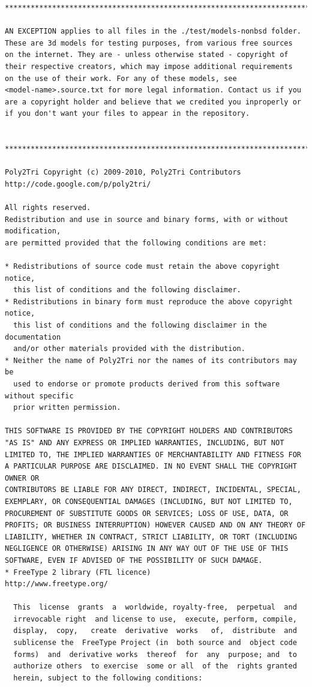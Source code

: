 \documentclass{article}
\begin{document}
\begin{lstlisting}
******************************************************************************

AN EXCEPTION applies to all files in the ./test/models-nonbsd folder.
These are 3d models for testing purposes, from various free sources
on the internet. They are - unless otherwise stated - copyright of
their respective creators, which may impose additional requirements
on the use of their work. For any of these models, see 
<model-name>.source.txt for more legal information. Contact us if you
are a copyright holder and believe that we credited you inproperly or 
if you don't want your files to appear in the repository.


******************************************************************************

Poly2Tri Copyright (c) 2009-2010, Poly2Tri Contributors
http://code.google.com/p/poly2tri/

All rights reserved.
Redistribution and use in source and binary forms, with or without modification,
are permitted provided that the following conditions are met:

* Redistributions of source code must retain the above copyright notice,
  this list of conditions and the following disclaimer.
* Redistributions in binary form must reproduce the above copyright notice,
  this list of conditions and the following disclaimer in the documentation
  and/or other materials provided with the distribution.
* Neither the name of Poly2Tri nor the names of its contributors may be
  used to endorse or promote products derived from this software without specific
  prior written permission.

THIS SOFTWARE IS PROVIDED BY THE COPYRIGHT HOLDERS AND CONTRIBUTORS
"AS IS" AND ANY EXPRESS OR IMPLIED WARRANTIES, INCLUDING, BUT NOT
LIMITED TO, THE IMPLIED WARRANTIES OF MERCHANTABILITY AND FITNESS FOR
A PARTICULAR PURPOSE ARE DISCLAIMED. IN NO EVENT SHALL THE COPYRIGHT OWNER OR
CONTRIBUTORS BE LIABLE FOR ANY DIRECT, INDIRECT, INCIDENTAL, SPECIAL,
EXEMPLARY, OR CONSEQUENTIAL DAMAGES (INCLUDING, BUT NOT LIMITED TO,
PROCUREMENT OF SUBSTITUTE GOODS OR SERVICES; LOSS OF USE, DATA, OR
PROFITS; OR BUSINESS INTERRUPTION) HOWEVER CAUSED AND ON ANY THEORY OF
LIABILITY, WHETHER IN CONTRACT, STRICT LIABILITY, OR TORT (INCLUDING
NEGLIGENCE OR OTHERWISE) ARISING IN ANY WAY OUT OF THE USE OF THIS
SOFTWARE, EVEN IF ADVISED OF THE POSSIBILITY OF SUCH DAMAGE.
* FreeType 2 library (FTL licence)
http://www.freetype.org/

  This  license  grants  a  worldwide, royalty-free,  perpetual  and
  irrevocable right  and license to use,  execute, perform, compile,
  display,  copy,   create  derivative  works   of,  distribute  and
  sublicense the  FreeType Project (in  both source and  object code
  forms)  and  derivative works  thereof  for  any  purpose; and  to
  authorize others  to exercise  some or all  of the  rights granted
  herein, subject to the following conditions:


\end{lstlisting}
\end{document}
